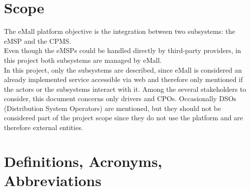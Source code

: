 \section{Scope}
\label{sec:scope}
The eMall platform objective is the integration between two subsystems: the eMSP and the CPMS. \\
Even though the eMSPs could be handled directly by third-party providers, in this project both subsystems are managed by eMall. \\ 
In this project, only the subsystems are described, since eMall is considered an already implemented service accessible via web and therefore only mentioned if the actors or the subsystems interact with it.
Among the several stakeholders to consider, this document concerns only drivers and CPOs. Occasionally DSOs (Distribution System Operators) are mentioned, but they should not be considered part of the project scope since they do not use the platform and are therefore external entities. \\

\section{Definitions, Acronyms, Abbreviations}
\label{sec:definitionsAcronymsAbbreviations}
